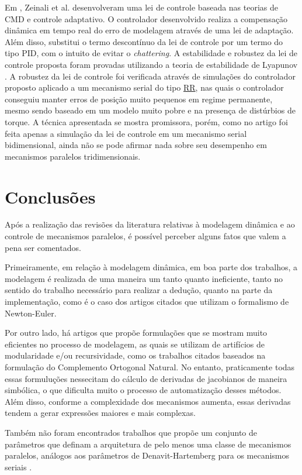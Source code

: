 \documentclass[]{politex}
\begin{document}
Em \cite{Zeinali}, Zeinali et al. desenvolveram uma lei de controle  baseada nas teorias de CMD e controle adaptativo. O controlador desenvolvido realiza a compensação dinâmica em tempo real do erro de modelagem através de uma lei de adaptação. Além disso, substitui o termo descontínuo da lei de controle por um termo do tipo PID, com o intuito de evitar o {\em chattering}. A estabilidade e robustez da lei de controle proposta foram provadas utilizando a teoria de estabilidade de Lyapunov \cite{Slotini}. A robustez da lei de controle foi verificada através de simulações do controlador proposto aplicado a um mecanismo serial do tipo \underline{R}\underline{R}, nas quais o controlador conseguiu manter erros de posição muito pequenos em regime permanente, mesmo sendo baseado em um modelo muito pobre e na presença de distúrbios de torque. A técnica apresentada se mostra promissora, porém, como no artigo foi feita apenas a simulação da lei de controle em um mecanismo serial bidimensional, ainda não se pode afirmar nada sobre seu desempenho em mecanismos paralelos tridimensionais.

\section{Conclusões}

Após a realização das revisões da literatura relativas à modelagem dinâmica e ao controle de mecanismos paralelos, é possível perceber alguns fatos que valem a pena ser comentados.

Primeiramente, em relação à modelagem dinâmica, em boa parte dos trabalhos, a modelagem é realizada de uma maneira um tanto quanto ineficiente, tanto no sentido do trabalho necessário para realizar a dedução, quanto na parte da implementação, como é o caso dos artigos citados que utilizam o formalismo de Newton-Euler. 

Por outro lado, há artigos que propõe formulações que se mostram muito eficientes no processo de modelagem, as quais se utilizam de artifícios de modularidade e/ou recursividade, como os trabalhos citados baseados na formulação do Complemento Ortogonal Natural. No entanto, praticamente todas essas formuluções nessecitam do cálculo de derivadas de jacobianos de maneira simbólica, o que dificulta muito o processo de automatização desses métodos. Além disso, conforme a complexidade dos mecanismos aumenta, essas derivadas tendem a gerar expressões maiores e mais complexas.

Também não foram encontrados trabalhos que propõe um conjunto de parâmetros que definam a arquitetura de pelo menos uma classe de mecanismos paralelos, análogos aos parâmetros de Denavit-Hartemberg para os mecanismos seriais \cite{Denavit}.
\end{document}
